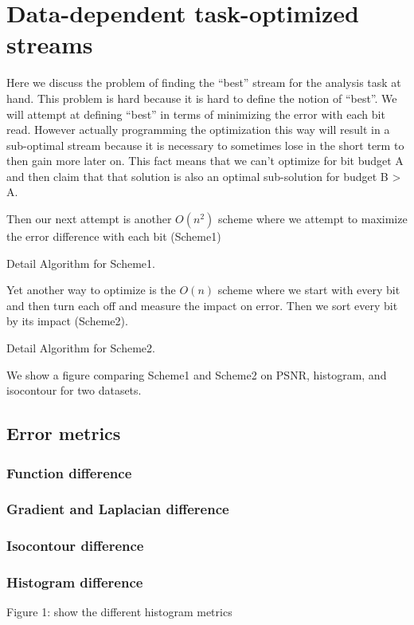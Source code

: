 \section{Data-dependent task-optimized streams}
Here we discuss the problem of finding the ``best'' stream for the analysis task at hand. This problem is hard because it is hard to define the notion of ``best''. We will attempt at defining ``best'' in terms of minimizing the error with each bit read. However actually programming the optimization this way will result in a sub-optimal stream because it is necessary to sometimes lose in the short term to then gain more later on. This fact means that we can't optimize for bit budget A and then claim that that solution is also an optimal sub-solution for budget B > A.

Then our next attempt is another $O(n^2)$ scheme where we attempt to maximize the error difference with each bit (Scheme1)

Detail Algorithm for Scheme1.

Yet another way to optimize is the $O(n)$ scheme where we start with every bit and then turn each off and measure the impact on error. Then we sort every bit by its impact (Scheme2).

Detail Algorithm for Scheme2.

We show a figure comparing Scheme1 and Scheme2 on PSNR, histogram, and isocontour for two datasets.

\subsection{Error metrics}
\subsubsection{Function difference}
\subsubsection{Gradient and Laplacian difference}
\subsubsection{Isocontour difference}
\subsubsection{Histogram difference}
Figure 1: show the different histogram metrics